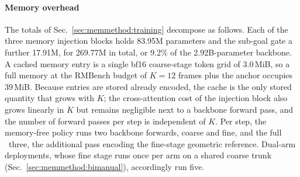\paragraph{Memory overhead}
The totals of Sec.~\ref{sec:memmethod:training} decompose as follows.
Each of the three memory injection blocks holds 83.95M parameters and
the sub-goal gate a further 17.91M, for 269.77M in total, or 9.2\% of
the 2.92B-parameter backbone.
A cached memory entry is a single bf16 coarse-stage token grid of
3.0\,MiB, so a full memory at the RMBench budget of $K{=}12$ frames
plus the anchor occupies 39\,MiB.
Because entries are stored already encoded, the cache is the only
stored quantity that grows with $K$; the cross-attention cost of the
injection block also grows linearly in $K$ but remains negligible next
to a backbone forward pass, and the number of forward passes per step
is independent of $K$.
Per step, the memory-free policy runs two backbone forwards, coarse and
fine, and the full \memmethod\ three, the additional pass encoding the
fine-stage geometric reference.
Dual-arm deployments, whose fine stage runs once per arm on a shared
coarse trunk (Sec.~\ref{sec:memmethod:bimanual}), accordingly run five.
